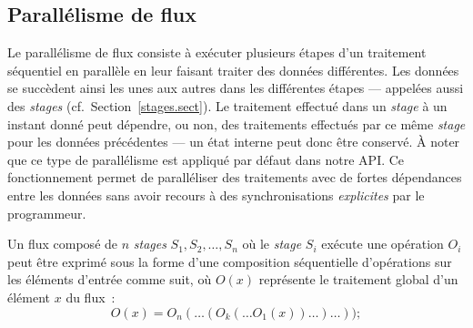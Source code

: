 



\subsection{Parall\'elisme de flux}

Le parall\'elisme de flux consiste \`a ex\'ecuter plusieurs \'etapes d'un traitement s\'equentiel en parall\`ele en leur faisant traiter des donn\'ees diff\'erentes. Les donn\'ees se succ\`edent ainsi les unes aux autres dans les diff\'erentes \'etapes --- appel\'ees  aussi des \emph{stages} (cf.~Section~\ref{stages.sect}).
%
Le traitement effectu\'e dans un \emph{stage} \`a un instant donn\'e peut d\'ependre, ou non, des traitements effectu\'es par ce m\^eme \emph{stage} pour les donn\'ees pr\'ec\'edentes --- un \'etat interne peut donc \^etre conserv\'e. 
%
\`A noter que ce type de parall\'elisme est appliqu\'e par d\'efaut dans notre API. 
%
Ce fonctionnement permet de parall\'eliser des traitements avec de fortes d\'ependances entre les donn\'ees sans avoir recours \`a des synchronisations \emph{explicites} par le programmeur. 

\goodbreak
\begin{samepage}
Un flux compos\'e de $n$ \emph{stages} $S_1, S_2, \ldots, S_n$ o\`u le \emph{stage} $S_i$ ex\'ecute une op\'eration $O_i$ peut \^etre exprim\'e sous la forme d'une composition s\'equentielle d'op\'erations sur les \'el\'ements d'entr\'ee comme suit, o\`u $O(x)$ repr\'esente le traitement global d'un \'el\'ement $x$ du flux~: 
%
\[
	O(x) = O_n( \ldots (O_k( \ldots O_1(x)) \ldots ) \ldots ));
\]
\end{samepage}


